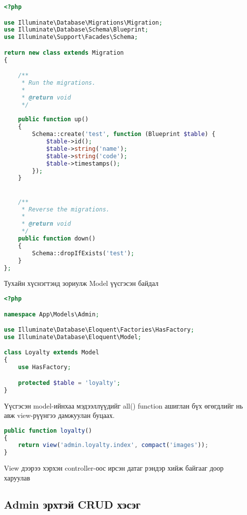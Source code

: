 \begin{lstlisting}[language=Php, caption=loyalty category нэртэй хүснэгт үүсгэх migration, frame=single]
<?php

use Illuminate\Database\Migrations\Migration;
use Illuminate\Database\Schema\Blueprint;
use Illuminate\Support\Facades\Schema;

return new class extends Migration
{

    /**
     * Run the migrations.
     *
     * @return void
     */
     
    public function up()
    {
        Schema::create('test', function (Blueprint $table) {
            $table->id();
            $table->string('name');
            $table->string('code');
            $table->timestamps();
        });
    }


    /**
     * Reverse the migrations.
     *
     * @return void
     */
    public function down()
    {
        Schema::dropIfExists('test');
    }
};

\end{lstlisting}

Тухайн хүснэгтэнд зориулж Model үүсгэсэн байдал

\begin{lstlisting}[language=Php, caption=Loyalty Model, frame=single]
<?php

namespace App\Models\Admin;

use Illuminate\Database\Eloquent\Factories\HasFactory;
use Illuminate\Database\Eloquent\Model;

class Loyalty extends Model
{
    use HasFactory;

    protected $table = 'loyalty';
}

\end{lstlisting}

Үүсгэсэн model-ийнхаа мэдээллүүдийг all() function ашиглан бүх өгөгдлийг нь авж view-рүүнгээ дамжуулан буцаах.

\begin{lstlisting}[language=Javascript, caption=View буцаах, frame=single]
public function loyalty()
{
    return view('admin.loyalty.index', compact('images'));
}

\end{lstlisting}
\pagebreak
View дээрээ хэрхэн controller-оос ирсэн датаг рэндэр хийж байгааг доор харуулав

\subsection{Admin эрхтэй CRUD хэсэг}

